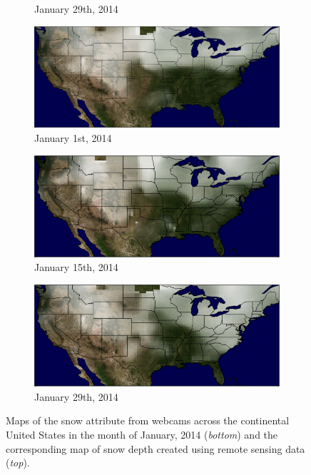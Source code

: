 \documentclass[10pt,twocolumn,letterpaper]{article}
\begin{document}
\begin{figure}
\begin{subfigure}[b]{0.33\textwidth}
    \caption{January 29th, 2014}
    \label{fig:snow_map_gt_3}
  \end{subfigure}
  \begin{subfigure}[b]{0.33\textwidth}
    \centering
		\includegraphics[width=\textwidth, trim= 0mm 0mm 0mm 0mm]{figs/snow_map_1.png}
    \caption{January 1st, 2014}
    \label{fig:snow_map_est_1}
  \end{subfigure}
  \begin{subfigure}[b]{0.33\textwidth}
    \centering
		\includegraphics[width=\textwidth, trim= 0mm 0mm 0mm 0mm]{figs/snow_map_2.png}
    \caption{January 15th, 2014}
    \label{fig:snow_map_est_2}
  \end{subfigure}
  \begin{subfigure}[b]{0.33\textwidth}
    \centering
		\includegraphics[width=\textwidth, trim= 0mm 0mm 0mm 0mm]{figs/snow_map_3.png}
    \caption{January 29th, 2014}
    \label{fig:snow_map_est_3}
  \end{subfigure}
  \caption{Maps of the snow attribute from webcams across the
           continental United States in the month of January, 2014 (\emph{bottom})
           and the corresponding map of snow depth created using remote 
           sensing data (\emph{top}).\protect\footnotemark} 
  \label{fig:snow_maps}
\end{figure}
\end{document}
